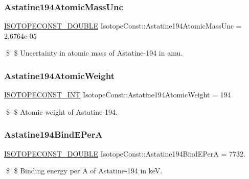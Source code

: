 \subsubsection{\texorpdfstring{Astatine194\+Atomic\+Mass\+Unc}{Astatine194AtomicMassUnc}}
{\footnotesize\ttfamily \mbox{\hyperlink{group___isotope_const-_macros_ga8f45a7272ce02c0b4c65c44636ed719a}{I\+S\+O\+T\+O\+P\+E\+C\+O\+N\+S\+T\+\_\+\+D\+O\+U\+B\+LE}} Isotope\+Const\+::\+Astatine194\+Atomic\+Mass\+Unc = 2.\+6764e-\/05}

\$ \$ Uncertainty in atomic mass of Astatine-\/194 in amu. \mbox{\label{group___isotope_const-_astatine-_at194_ga4e602592a16d681912a24ee425e51888}} 
\subsubsection{\texorpdfstring{Astatine194\+Atomic\+Weight}{Astatine194AtomicWeight}}
{\footnotesize\ttfamily \mbox{\hyperlink{group___isotope_const-_macros_ga5f18360b3e99483a35c32d789e62621c}{I\+S\+O\+T\+O\+P\+E\+C\+O\+N\+S\+T\+\_\+\+I\+NT}} Isotope\+Const\+::\+Astatine194\+Atomic\+Weight = 194}

\$ \$ Atomic weight of Astatine-\/194. \mbox{\label{group___isotope_const-_astatine-_at194_ga0167f6a9e7bb48dca7268b407504af98}} 
\subsubsection{\texorpdfstring{Astatine194\+Bind\+E\+PerA}{Astatine194BindEPerA}}
{\footnotesize\ttfamily \mbox{\hyperlink{group___isotope_const-_macros_ga8f45a7272ce02c0b4c65c44636ed719a}{I\+S\+O\+T\+O\+P\+E\+C\+O\+N\+S\+T\+\_\+\+D\+O\+U\+B\+LE}} Isotope\+Const\+::\+Astatine194\+Bind\+E\+PerA = 7732.}

\$ \$ Binding energy per A of Astatine-\/194 in keV. \mbox{\label{group___isotope_const-_astatine-_at194_gadd8f723271a1439fcf03246358ed5546}} 
